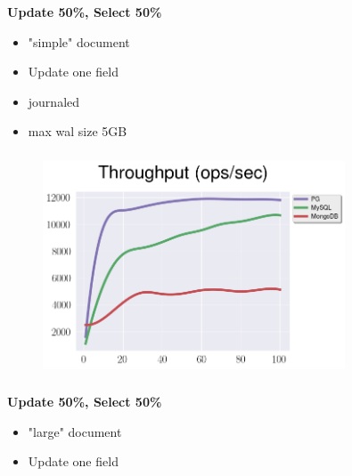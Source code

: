 \documentclass[usenames,dvipsnames, 18pt, compress, aspectratio=169]{beamer}
\begin{document}
\begin{frame}
    \frametitle{}
    \begin{center}
        \textbf{Update 50\%, Select 50\%}
        \begin{itemize}[label={}]
            \item "simple" document
            \item Update one field
            \item journaled
            \item max wal size 5GB
        \end{itemize}
    \end{center}
\end{frame}


\begin{frame}
    \frametitle{}
    \begin{center}
    \vspace{10pt}
    \begin{figure}
        \includegraphics[width=0.8\textwidth,center]{benchmarks/update_btree_wal_size.png}
    \end{figure}
    \end{center}
\end{frame}

\begin{frame}
    \frametitle{}
    \begin{center}
        \textbf{Update 50\%, Select 50\%}
        \begin{itemize}[label={}]
            \item "large" document
            \item Update one field
        \end{itemize}
    \end{center}
\end{frame}
\end{document}
